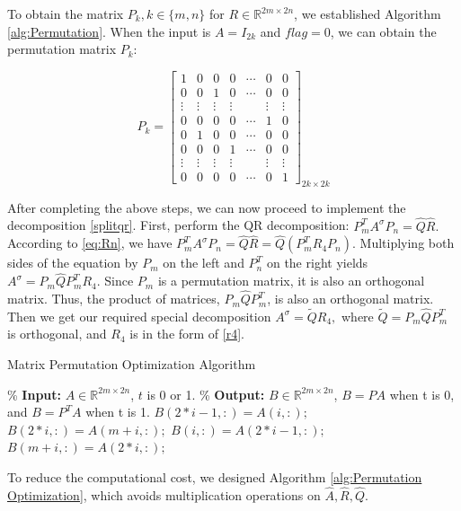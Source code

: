 \documentclass[3p]{elsarticle}
\numberwithin{equation}{section}
\begin{document}
To obtain the matrix $P_k, k\in \{m,n\}$ for $R \in \mathbb{R}^{2m \times 2n}$, we established Algorithm \ref{alg:Permutation}. When the input is $A=I_{2k}$ and $flag=0$, we can obtain the permutation matrix $P_k$:

\begin{equation}\label{p}
    P_k = \begin{bmatrix} 
            1 & 0 & 0 & 0 & \cdots & 0 & 0\\ 
            0 & 0 & 1 & 0 & \cdots & 0 & 0\\ 
            \vdots & \vdots & \vdots & \vdots &  & \vdots & \vdots\\ 
            0 & 0 & 0 & 0 & \cdots & 1 & 0 \\
            0 & 1 & 0 & 0 & \cdots & 0 & 0\\ 
            0 & 0 & 0 & 1 & \cdots & 0 & 0\\ 
            \vdots & \vdots & \vdots & \vdots &  & \vdots & \vdots\\ 
            0 & 0 & 0 & 0 &\cdots & 0 & 1 
        \end{bmatrix}_{2k \times 2k}
\end{equation}


After completing the above steps, we can now proceed to implement the decomposition \eqref{splitqr}.
First, perform the QR decomposition:
$P_m^TA^\sigma P_n = \widehat{Q}\widehat{R}.$ 
According to \eqref{eq:Rn}, we have
$
P_m^TA^\sigma P_n = \widehat{Q}\widehat{R} = \widehat{Q}(P_m^TR_4P_n).
$
Multiplying both sides of the equation by $P_m$ on the left and $P_n^T$ on the right yields
$
A^\sigma=P_m\widehat{Q}P_m^T R_4.
$ Since $P_m$ is a permutation matrix, it is also an orthogonal matrix. Thus, the product of matrices, $P_m\widehat{Q}P_m^T$, is also an orthogonal matrix. Then we get our required special decomposition $A^\sigma=\widetilde{Q}R_4,$ where $\widetilde{Q}=P_m\widehat{Q}P_m^T$ is orthogonal, and $R_4$ is in the form of \eqref{r4}.
\begin{algorithm}[htbp]
    \caption{Matrix Permutation Optimization Algorithm}
    \label{alg:Permutation Optimization}
    \begin{algorithmic}[1]
        \State \% \textbf{Input:} $ A\in \mathbb{R}^{2m\times 2n}$, $t$ is 0 or 1.
        \State \% \textbf{Output:} $B \in\mathbb{R}^{2m\times 2n}$, $B=PA$ when t is 0, and $B=P^TA$ when t is 1.
            \State $B(2*i-1, :) = A(i, :);$
            \State $B(2*i, :) = A(m+i, :);$
          \End
        \Else
            \State $B(i, :) = A(2*i-1, :);$
            \State $B(m+i, :) = A(2*i, :);$
          \End
        \End
    \End 
    \end{algorithmic}
\end{algorithm}
To reduce the computational cost, we designed Algorithm \ref{alg:Permutation Optimization}, which avoids multiplication operations on $\widehat{A}, \widehat{R}, \widehat{Q}$.
\end{document}
